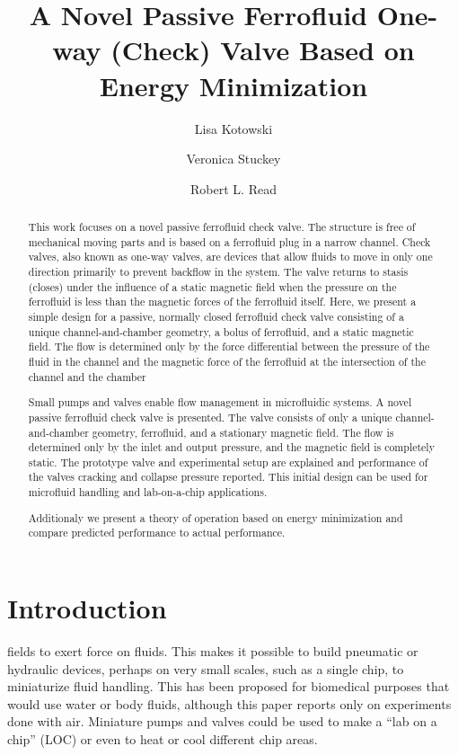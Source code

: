 \documentclass[]{asme2ej}
\title{A Novel Passive Ferrofluid One-way (Check) Valve Based on Energy Minimization}
\author{Lisa Kotowski
  \affiliation{
    Inventor + Physicist \\
    }
}
\author{Veronica Stuckey
  \affiliation{
    Biomedical Engineer, University of Texas at Austin \\
    }
}
\author{Robert L. Read
\affiliation{
  Founder, Public Invention\\
    }
}
\begin{document}
\maketitle

\begin{abstract}

This work focuses on a novel passive ferrofluid check valve. The structure is free of mechanical moving parts and is based on a ferrofluid plug in a narrow channel.
Check valves, also known as one-way valves, are devices that allow fluids to move in only one direction primarily to prevent backflow in the system.
The valve returns to stasis (closes) under the influence of a static magnetic field when the pressure on the ferrofluid is less than the magnetic forces of the ferrofluid itself.
Here, we present a simple design for a passive, normally closed ferrofluid check valve consisting of a unique channel-and-chamber geometry, a bolus of ferrofluid, and a static magnetic field.
The flow is determined only by the force differential between the pressure of the fluid in the channel and the magnetic force of the ferrofluid at the intersection of the channel and the chamber

Small pumps and valves enable flow management in microfluidic systems.
A novel passive ferrofluid check valve is presented.
The valve consists of only a
unique channel-and-chamber geometry, ferrofluid, and a stationary
magnetic field.
The flow is determined only by the inlet and output pressure,
and the magnetic field is completely static.
The prototype valve and experimental setup are explained
and performance of the valves cracking and collapse pressure reported.
This initial design can be used for microfluid handling and lab-on-a-chip
applications.

Additionaly we present a theory of operation based on energy minimization
and compare predicted performance to actual performance.
\end{abstract}

\section{Introduction}


fields to exert force on fluids\cite{torres2014recent,kole2021engineering,ozbey2015modeling}.
This makes it possible to build pneumatic or hydraulic
devices, perhaps on very small scales,
such as a single chip\cite{yamahata2003ferrofluid,hatch2001ferrofluidic}, to
miniaturize fluid handling.
This has been proposed for biomedical purposes\cite{michelson2019novel}
that would use water or body fluids,
although this paper reports only on experiments done with air.
Miniature pumps and valves could be used to make a “lab on a chip” (LOC) or
even to heat or cool different chip areas.
\end{document}

